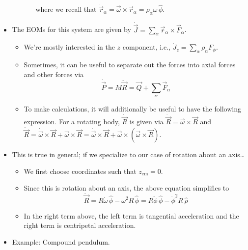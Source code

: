 \documentclass[../notes.tex]{subfiles}
\begin{document}
\begin{itemize}
\begin{itemize}
\begin{itemize}
\begin{equation*}
            \end{equation*}
            where we recall that $\dot{\vec{r}}_\alpha=\vec{\omega}\times\vec{r}_\alpha=\rho_\alpha\omega\,\hat{\phi}$.
        \end{itemize}
    \end{itemize}
    \item The EOMs for this system are given by $\dot{\vec{J}}=\sum_\alpha\vec{r}_\alpha\times\vec{F}_\alpha$.
    \begin{itemize}
        \item We're mostly interested in the $z$ component, i.e., $\dot{J}_z=\sum_\alpha\rho_\alpha F_\phi$.
        \item Sometimes, it can be useful to separate out the forces into axial forces and other forces via
        \begin{equation*}
            \dot{\vec{P}} = M\ddot{\vec{R}}
            = \vec{Q}+\sum_\alpha\vec{F}_\alpha
        \end{equation*}
        \item To make calculations, it will additionally be useful to have the following expression. For a rotating body, $\dot{\vec{R}}$ is given via $\dot{\vec{R}}=\vec{\omega}\times\vec{R}$ and $\ddot{\vec{R}}=\dot{\vec{\omega}}\times\vec{R}+\vec{\omega}\times\dot{\vec{R}}=\dot{\vec{\omega}}\times\vec{R}+\vec{\omega}\times(\vec{\omega}\times\vec{R})$.
    \end{itemize}
    \item This is true in general; if we specialize to our case of rotation about an axis\dots
    \begin{itemize}
        \item We first choose coordinates such that $z_\text{cm}=0$.
        \item Since this is rotation about an axis, the above equation simplifies to
        \begin{equation*}
            \ddot{\vec{R}} = R\dot{\omega}\,\hat{\phi}-\omega^2R\,\hat{\phi}
            = R\ddot{\phi}\,\hat{\phi}-\dot{\phi}^2R\,\hat{\rho}
        \end{equation*}
        \item In the right term above, the left term is tangential acceleration and the right term is centripetal acceleration.
    \end{itemize}
    \item Example: Compound pendulum.
    \begin{figure}[h!]
        \centering
\end{figure}
\end{itemize}
\end{document}
